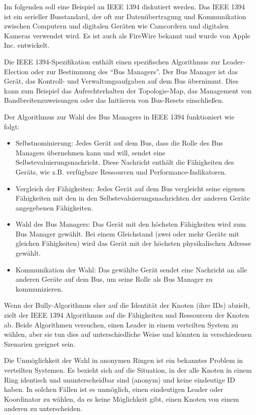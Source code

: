Im folgenden soll eine Beispiel an IEEE 1394 diskutiert werden. Das IEEE 1394 ist ein serieller Busstandard, der oft zur Datenübertragung und Kommunikation zwischen Computern und digitalen Geräten wie Camcordern und digitalen Kameras verwendet wird. Es ist auch als FireWire bekannt und wurde von Apple Inc. entwickelt.

Die IEEE 1394-Spezifikation enthält einen spezifischen Algorithmus zur Leader-Election oder zur Bestimmung des \enquote{Bus Managers}. Der Bus Manager ist das Gerät, das Kontroll- und Verwaltungsaufgaben auf dem Bus übernimmt. Dies kann zum Beispiel das Aufrechterhalten der Topologie-Map, das Management von Bandbreitenzuweisungen oder das Initiieren von Bus-Resets einschließen.

Der Algorithmus zur Wahl des Bus Managers in IEEE 1394 funktioniert wie folgt:
\begin{itemize}
\item Selbstnominierung: Jedes Gerät auf dem Bus, dass die Rolle des Bus Managers übernehmen kann und will, sendet eine Selbstevaluierungsnachricht. Diese Nachricht enthält die Fähigkeiten des Geräts, wie z.B. verfügbare Ressourcen und Performance-Indikatoren.
\item Vergleich der Fähigkeiten: Jedes Gerät auf dem Bus vergleicht seine eigenen Fähigkeiten mit den in den Selbstevaluierungsnachrichten der anderen Geräte angegebenen Fähigkeiten.
\item Wahl des Bus Managers: Das Gerät mit den höchsten Fähigkeiten wird zum Bus Manager gewählt. Bei einem Gleichstand (zwei oder mehr Geräte mit gleichen Fähigkeiten) wird das Gerät mit der höchsten physikalischen Adresse gewählt.
\item Kommunikation der Wahl: Das gewählte Gerät sendet eine Nachricht an alle anderen Geräte auf dem Bus, um seine Rolle als Bus Manager zu kommunizieren.
\end{itemize}
Wenn der  Bully-Algorithmus eher auf die Identität der Knoten (ihre IDs) abzielt, zielt der IEEE 1394 Algorithmus auf die Fähigkeiten und Ressourcen der Knoten ab. Beide Algorithmen versuchen, einen Leader in einem verteilten System zu wählen, aber sie tun dies auf unterschiedliche Weise und könnten in verschiedenen Szenarien geeignet sein.

Die Unmöglichkeit der Wahl in anonymen Ringen ist ein bekanntes Problem in verteilten Systemen. Es bezieht sich auf die Situation, in der alle Knoten in einem Ring identisch und ununterscheidbar sind (anonym) und keine eindeutige ID haben. In solchen Fällen ist es unmöglich, einen eindeutigen Leader oder Koordinator zu wählen, da es keine Möglichkeit gibt, einen Knoten von einem anderen zu unterscheiden.

